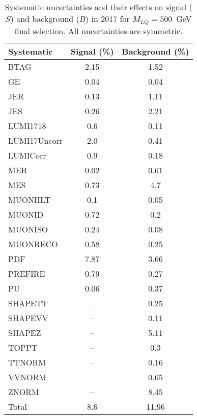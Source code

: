 \begin{table}[htbp]
\begin{center}
\caption{Systematic uncertainties and their effects on signal ($S$) and background ($B$) in 2017 for $M_{LQ}=500$~GeV final selection. All uncertainties are symmetric.}
\begin{tabular}{lcc}
\hline\hline
Systematic & Signal (\%) & Background (\%) \\ \hline 
BTAG & 2.15 & 1.52\\ 
GE & 0.04 & 0.04\\ 
JER & 0.13 & 1.11\\ 
JES & 0.26 & 2.21\\ 
LUMI1718 & 0.6 & 0.11\\ 
LUMI17Uncorr & 2.0 & 0.41\\ 
LUMICorr & 0.9 & 0.18\\ 
MER & 0.02 & 0.61\\ 
MES & 0.73 & 4.7\\ 
MUONHLT & 0.1 & 0.05\\ 
MUONID & 0.72 & 0.2\\ 
MUONISO & 0.24 & 0.08\\ 
MUONRECO & 0.58 & 0.25\\ 
PDF & 7.87 & 3.66\\ 
PREFIRE & 0.79 & 0.27\\ 
PU & 0.06 & 0.37\\ 
SHAPETT & -- & 0.25\\ 
SHAPEVV & -- & 0.11\\ 
SHAPEZ & -- & 5.11\\ 
TOPPT & -- & 0.3\\ 
TTNORM & -- & 0.16\\ 
VVNORM & -- & 0.65\\ 
ZNORM & -- & 8.45\\ 
Total & 8.6 & 11.96\\ \hline \hline
\end{tabular}
\label{tab:SysUncertainties_uujj_500}
\end{center}
\end{table}

